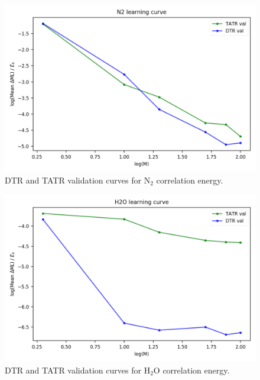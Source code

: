 \begin{figure}
    \centering
    \includegraphics[scale=1.0]{p2/figures/si/N2_learn_log_e.png}
    \caption{DTR and TATR validation curves for N$_2$ correlation energy.}
\end{figure}

\begin{figure}
    \centering
    \includegraphics[scale=1.0]{p2/figures/si/H2O_learn_log_e.png}
    \caption{DTR and TATR validation curves for H$_2$O correlation energy.}
\end{figure}


